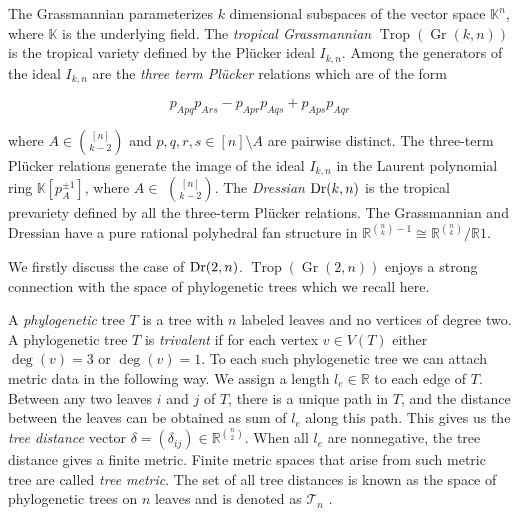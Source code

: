 \documentclass[10pt,a4paper]{amsart}
\DeclareMathOperator{\Dr}{\rm Dr}
\DeclareMathOperator{\Trop}{Trop}
\DeclareMathOperator{\Gr}{Gr}
\theoremstyle{plain}
\theoremstyle{definition}
\numberwithin{subcase}{case}
\begin{document}
The Grassmannian parameterizes $k$ dimensional subspaces of the vector space $\mathbb{K}^{n}$, where $\mathbb{K}$ is the underlying field. The \emph{tropical Grassmannian} $\Trop(\Gr(k,n))$ is the tropical variety defined by the Pl\"ucker ideal $I_{k,n}$. Among the generators of the ideal $I_{k,n}$ are the \emph{three term Pl\"ucker} relations which are of the form

\[ p_{Apq}p_{Ars} - p_{Apr}p_{Aqs} + p_{Aps}p_{Aqr}\]


where $A \in \binom{[n]}{k-2}$ and $p,q,r,s \in [n] \setminus A$ are pairwise distinct. The three-term Pl\"ucker relations generate the image of the ideal $I_{k,n}$ in the Laurent polynomial ring $\mathbb{K}[p_{A}^{\pm 1}]$, where  $A \in $ $\binom{[n]}{k-2}$. The \emph{Dressian} $\Dr(k,n)$ is the tropical prevariety defined by all the three-term Pl\"ucker relations. The Grassmannian and Dressian have a pure rational polyhedral fan structure in $\mathbb{R}^{{\binom{n}{k}} - 1 } \cong  \mathbb{R}^{\binom{n}{k}} / \mathbb{R}1$.

We firstly discuss the case of $\Dr(2,n)$. $\Trop(\Gr(2,n))$ enjoys a strong connection with the space of phylogenetic trees which we recall here.

A \emph{phylogenetic} tree $T$ is a tree with $n$ labeled leaves and no vertices of degree two. A phylogenetic tree $T$ is \textit{trivalent} if for each vertex $v \in V(T)$ either $\deg(v) = 3$ or $\deg(v) = 1$. To each such phylogenetic tree we can attach metric data in the following way. We assign a length $l_{e} \in \mathbb{R}$ to each edge of $T$. Between any two leaves $i$ and $j$ of $T$, there is a unique path in $T$, and the distance between the leaves can be obtained as sum of $l_{e}$ along this path. This gives us the \emph{tree distance} vector $\delta = (\delta_{ij}) \in \mathbb{R}^{\binom{n}{2}}$. When all $l_{e}$ are nonnegative, the tree distance gives a finite metric. Finite metric spaces that arise from such metric tree are called \emph{tree metric}. The set of all tree distances is known as the space of phylogenetic trees on $n$ leaves and is denoted as $\mathcal{T}_{n}$ \cite{maclagan2021}.
\end{document}
